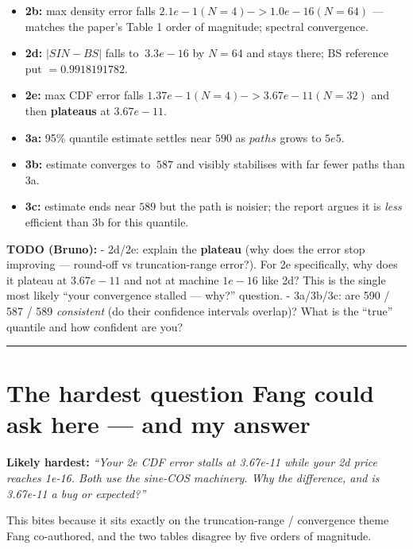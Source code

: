 \documentclass[
  11pt,
]{article}
\providecommand{\tightlist}{%
  \setlength{\itemsep}{0pt}\setlength{\parskip}{0pt}}
\begin{document}
\begin{itemize}
\tightlist
\item
  \textbf{2b:} max density error falls
  \(2.1e-1 (N=4) -> 1.0e-16 (N=64)\) --- matches the paper's Table 1
  order of magnitude; spectral convergence.
\item
  \textbf{2d:} \(|SIN - BS|\) falls to \(~3.3e-16\) by \(N=64\) and
  stays there; BS reference put \(= 0.9918191782\).
\item
  \textbf{2e:} max CDF error falls \(1.37e-1 (N=4) -> 3.67e-11 (N=32)\)
  and then \textbf{plateaus} at \(3.67e-11\).
\item
  \textbf{3a:} 95\% quantile estimate settles near \(590\) as \(paths\)
  grows to \(5e5\).
\item
  \textbf{3b:} estimate converges to \(~587\) and visibly stabilises
  with far fewer paths than 3a.
\item
  \textbf{3c:} estimate ends near \(589\) but the path is noisier; the
  report argues it is \emph{less} efficient than 3b for this quantile.
\end{itemize}

\textbf{TODO (Bruno):} - 2d/2e: explain the \textbf{plateau} (why does
the error stop improving --- round-off vs truncation-range error?). For
2e specifically, why does it plateau at \(3.67e-11\) and not at machine
\(1e-16\) like 2d? This is the single most likely ``your convergence
stalled --- why?'' question. - 3a/3b/3c: are 590 / 587 / 589
\emph{consistent} (do their confidence intervals overlap)? What is the
``true'' quantile and how confident are you?

\begin{center}\rule{0.5\linewidth}{0.5pt}\end{center}

\hypertarget{the-hardest-question-fang-could-ask-here-and-my-answer}{%
\section{The hardest question Fang could ask here --- and my
answer}\label{the-hardest-question-fang-could-ask-here-and-my-answer}}

\textbf{Likely hardest:} \emph{``Your 2e CDF error stalls at 3.67e-11
while your 2d price reaches 1e-16. Both use the sine-COS machinery. Why
the difference, and is 3.67e-11 a bug or expected?''}

This bites because it sits exactly on the truncation-range / convergence
theme Fang co-authored, and the two tables disagree by five orders of
magnitude.
\end{document}

